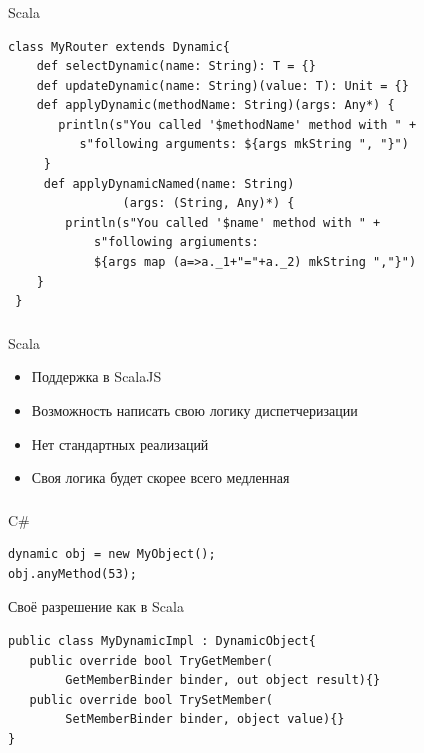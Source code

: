 \documentclass[t]{beamer}  %
\newcommand\pro{\item[$+$]} 		%
\newcommand\con{\item[$-$]} 		%
\begin{document}
\begin{frame}[fragile]
	\frametitle{\insertsection} 
    \framesubtitle{\insertsubsection}
\begin{block}{Scala}
	\begin{verbatim}
class MyRouter extends Dynamic{
    def selectDynamic(name: String): T = {}
    def updateDynamic(name: String)(value: T): Unit = {}
    def applyDynamic(methodName: String)(args: Any*) {
       println(s"You called '$methodName' method with " +
          s"following arguments: ${args mkString ", "}")
     }
     def applyDynamicNamed(name: String)
     			(args: (String, Any)*) {
        println(s"You called '$name' method with " +
            s"following argiuments: 
            ${args map (a=>a._1+"="+a._2) mkString ","}")
    }
 }
	\end{verbatim}
\end{block}
\end{frame}

\begin{frame}[fragile]
	\frametitle{\insertsection} 
    \framesubtitle{\insertsubsection}
\begin{block}{Scala}
\begin{itemize}
        \pro Поддержка в ScalaJS
        \pro Возможность написать свою логику диспетчеризации
        \con Нет стандартных реализаций
        \con Своя логика будет скорее всего медленная
   \end{itemize}
\end{block}
\end{frame}


\begin{frame}[fragile]
	\frametitle{\insertsection} 
    \framesubtitle{\insertsubsection}
	\begin{block}{C\#}
		\begin{verbatim}
dynamic obj = new MyObject();
obj.anyMethod(53);
		\end{verbatim}
	\end{block}
   	\begin{block}{Своё разрешение как в Scala}
		\begin{verbatim}
public class MyDynamicImpl : DynamicObject{
   public override bool TryGetMember(
        GetMemberBinder binder, out object result){}
   public override bool TrySetMember(
        SetMemberBinder binder, object value){}
}
        \end{verbatim}
	\end{block}
\end{frame}
\end{document}
